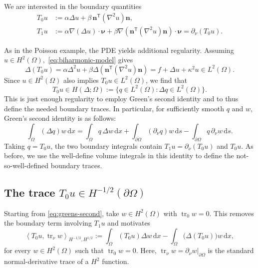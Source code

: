 \documentclass[11pt,a4paper]{article}
\newcommand{\Om}{\Omega}
\newcommand{\dd}{\,\mathrm{d}}
\newcommand{\tr}{\operatorname{tr}}
\newcommand{\grad}{\nabla}
\newcommand{\HDelta}{H(\Delta;\Om)}
\newcommand{\dual}[2]{\left\langle #1,#2\right\rangle}
\begin{document}
We are interested in the boundary quantities
\begin{align}
    T_0u&:=\alpha\Delta u
                 +\beta\,\mathbf n^{\mathsf T}(\nabla^2u)\mathbf n,
                    \label{eq:T0formal}\\
    T_1u&:=\alpha\grad(\Delta u)\cdot\boldsymbol\nu
       +\beta\grad\!\left(\mathbf n^{\mathsf T}
                     (\nabla^2u)\mathbf n\right)\cdot\boldsymbol\nu
       =\partial_\nu(T_0u).
                    \label{eq:T1formal}
\end{align}

As in the Poisson example, the PDE yields additional regularity. Assuming
$u\in H^2(\Om),$ \eqref{eq:biharmonic-model} gives
\[
    \Delta(T_0u)
      =\alpha\Delta^2u
       +\beta\Delta\!\left(\mathbf n^{\mathsf T}
                          (\nabla^2u)\mathbf n\right)
      =f+\Delta u+\kappa^2u\in L^2(\Om).
\]
Since $u\in H^2(\Om)$ also implies $T_0u\in L^2(\Om)$, we find that
\[
    T_0u\in\HDelta
       :=\bigl\{q\in L^2(\Om):\Delta q\in L^2(\Om)\bigr\}.
\]
This is just enough regularity to employ Green's second identity and to thus define the needed boundary traces. In particular, for sufficiently smooth $q$ and $w$, Green's second identity is as follows:
\begin{equation}\label{eq:greens-second}
    \int_\Om(\Delta q)w\dd x
      =\int_\Om q\,\Delta w\dd x
       +\int_{\partial\Om}(\partial_\nu q)w\dd s
       -\int_{\partial\Om}q\,\partial_\nu w\dd s.
\end{equation}
Taking $q=T_0u$, the two boundary integrals contain $T_1u=\partial_\nu(T_0u)$
and $T_0u$. As before, we use the well-define volume integrals in this identity to define the not-so-well-defined
boundary traces. 

\subsection{The trace \texorpdfstring{$T_0u\in H^{-1/2}(\partial\Om)$}{T0}}

Starting from \eqref{eq:greens-second}, take $w\in H^2(\Om)$ with
$\tr_0w=0$. This removes the boundary term involving $T_1u$ and motivates
\begin{equation}\label{eq:T0weak}
    \dual{T_0u}{\tr_\nu w}_{H^{-1/2},H^{1/2}}
       :=\int_\Om(T_0u)\Delta w\dd x
         -\int_\Om\bigl(\Delta(T_0u)\bigr)w\dd x,
\end{equation}
for every $w\in H^2(\Om)$ such that $\tr_0w=0.$
Here, $\tr_\nu w=\partial_\nu w|_{\partial\Om}$ is the standard normal-derivative trace of a $H^2$ function.
\end{document}
